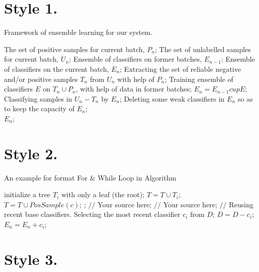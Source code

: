 \documentclass[UTF8]{article}
\begin{document}
\section{Style 1.}

\begin{algorithm}[htb]
\caption{ Framework of ensemble learning for our system.}
\label{alg:Framwork}
\begin{algorithmic}[1]
\Require
The set of positive samples for current batch, $P_n$;
The set of unlabelled samples for current batch, $U_n$;
Ensemble of classifiers on former batches, $E_{n-1}$;
\Ensure
Ensemble of classifiers on the current batch, $E_n$;
\State Extracting the set of reliable negative and/or positive samples $T_n$ from $U_n$ with help of $P_n$;
\label{code:fram:extract}
\State Training ensemble of classifiers $E$ on $T_n \cup P_n$, with help of data in former batches;
\label{code:fram:trainbase}
\State $E_n=E_{n-1}cup E$;
\label{code:fram:add}
\State Classifying samples in $U_n-T_n$ by $E_n$;
\label{code:fram:classify}
\State Deleting some weak classifiers in $E_n$ so as to keep the capacity of $E_n$;
\label{code:fram:select} \\
\Return $E_n$;
\end{algorithmic}
\end{algorithm}


\section{Style 2.}

\begin{algorithm}[h]
\caption{An example for format For \& While Loop in Algorithm}
\begin{algorithmic}[1]
\State initialize a tree $T_{i}$ with only a leaf (the root);
\State $T=T\cup T_{i};$
\EndFor
{}
\label{code:TrainBase:getc}
\State $T=T\cup PosSample(c)$;
\label{code:TrainBase:pos}
\EndFor;
\State $//$ Your source here;
\EndFor
{}
\State $//$ Your source here;
\EndFor
\State $//$ Reusing recent base classifiers.
\label{code:recentStart}
\State Selecting the most recent classifier $c_i$ from $D$;
\State $D=D-c_i$;
\State $E_n=E_n+c_i$;
\EndWhile
\label{code:recentEnd}
\end{algorithmic}
\end{algorithm}

\section{Style 3.}
\end{document}
